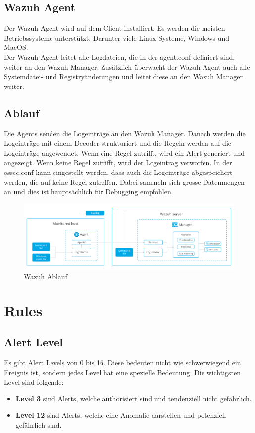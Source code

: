\subsection{Wazuh Agent}
Der Wazuh Agent wird auf dem Client installiert.
Es werden die meisten Betriebssysteme unterstützt. Darunter viele Linux Systeme, Windows und MacOS.\\

Der Wazuh Agent leitet alle Logdateien, die in der agent.conf definiert sind, weiter an den Wazuh Manager.
Zusätzlich überwacht der Wazuh Agent auch alle Systemdatei- und Registryänderungen und leitet diese an den Wazuh Manager weiter. 

\subsection{Ablauf}
Die Agents senden die Logeinträge an den Wazuh Manager.
Danach werden die Logeinträge mit einem Decoder strukturiert und die Regeln werden auf die Logeinträge angewendet.
Wenn eine Regel zutrifft, wird ein Alert generiert und angezeigt.
Wenn keine Regel zutrifft, wird der Logeintrag verworfen.
In der ossec.conf kann eingestellt werden, dass auch die Logeinträge abgespeichert werden, die auf keine Regel zutreffen.
Dabei sammeln sich grosse Datenmengen an und dies ist hauptsächlich für Debugging empfohlen.

\begin{figure}[H]
    \centering
    \includegraphics[width=\linewidth]{../img/wazuh-ablauf.png}
    \caption[Wazuh Ablauf]{Wazuh Ablauf\footnotemark}
\end{figure}

\section{Rules}
\subsection{Alert Level}
Es gibt Alert Levels von 0 bis 16. 
Diese bedeuten nicht wie schwerwiegend ein Ereignis ist, sondern jedes Level hat eine spezielle Bedeutung.
Die wichtigsten Level sind folgende:
\begin{itemize}
    \item \textbf{Level 3} sind Alerts, welche authorisiert sind und tendenziell nicht gefährlich.
    \item \textbf{Level 12} sind Alerts, welche eine Anomalie darstellen und potenziell gefährlich sind.
\end{itemize}

